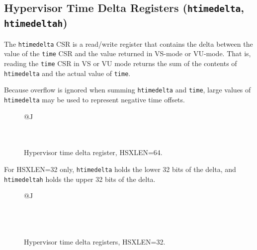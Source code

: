 \subsection{Hypervisor Time Delta Registers ({\tt htimedelta}, {\tt htimedeltah})}

The {\tt htimedelta} CSR is a read/write register that contains the delta
between the value of the {\tt time} CSR and the value returned in VS-mode or
VU-mode.
That is, reading the {\tt time} CSR in VS or VU mode returns the sum of the
contents of {\tt htimedelta} and the actual value of {\tt time}.

\begin{commentary}
Because overflow is ignored when summing {\tt htimedelta} and {\tt time},
large values of {\tt htimedelta} may be used to represent negative time
offsets.
\end{commentary}

\begin{figure}[h!]
{\footnotesize
\begin{center}
\begin{tabular}{@{}J}
 \\
\hline
{} \\
 \\
\end{tabular}
\end{center}
}
\vspace{-0.1in}
\caption{Hypervisor time delta register, HSXLEN=64.}
\label{hdeltareg}
\end{figure}

For HSXLEN=32 only, {\tt htimedelta} holds the lower 32 bits of the
delta, and {\tt htimedeltah} holds the upper 32 bits of the delta.

\begin{figure}[h!]
{\footnotesize
\begin{center}
\begin{tabular}{@{}J}
 \\
\hline
{} \\
\hline
{} \\
 \\
\end{tabular}
\end{center}
}
\vspace{-0.1in}
\caption{Hypervisor time delta registers, HSXLEN=32.}
\label{hdeltahreg}
\end{figure}

